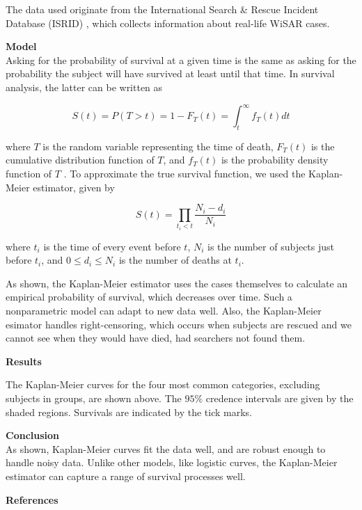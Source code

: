 \documentclass[serif,final]{beamer}
\newcommand{\heading}[1]{{\large \textbf{#1}}\\}
\newcommand{\subheading}[1]{{\textbf{#1}}\\}
\begin{document}
\begin{frame}
\begin{multicols}{3}
      The data used originate from the International Search \& Rescue Incident
      Database (ISRID) \cite{isrid}, which collects information about real-life
      WiSAR cases.

      \indent

      \subheading{Model}

      Asking for the probability of survival at a given time is the same as
      asking for the probability the subject will have survived at least until
      that time. In survival analysis, the latter can be written as

      $$S(t) = P(T > t) = 1 - F_T(t) = \int_t^\infty f_T(t) dt$$

      where $T$ is the random variable representing the time of death, $F_T(t)$
      is the cumulative distribution function of $T$, and $f_T(t)$ is the
      probability density function of $T$ \cite{rochford}. To approximate the
      true survival function, we used the Kaplan-Meier estimator, given by

      $$S(t) = \prod_{t_i < t} \frac{N_i - d_i}{N_i}$$

      where $t_i$ is the time of every event before $t$, $N_i$ is the number of
      subjects just before $t_i$, and $0 \leq d_i \leq N_i$ is the number of
      deaths at $t_i$.

      \indent

      As shown, the Kaplan-Meier estimator uses the cases themselves to
      calculate an empirical probability of survival, which decreases over
      time. Such a nonparametric model can adapt to new data well. Also, the
      Kaplan-Meier esimator handles right-censoring, which occurs when subjects
      are rescued and we cannot see when they would have died, had searchers
      not found them.

      \indent

      \vfill
      \columnbreak

      \heading{Results}

      \begin{center}
        
      \end{center}

      The Kaplan-Meier curves for the four most common categories, excluding
      subjects in groups, are shown above. The $95\%$ credence intervals are
      given by the shaded regions. Survivals are indicated by the tick marks.

      \indent

      \heading{Conclusion}
        As shown, Kaplan-Meier curves fit the data well, and are robust enough
        to handle noisy data. Unlike other models, like logistic curves, the
        Kaplan-Meier estimator can capture a range of survival processes well.

      \indent

      \heading{References}
      
      
    \end{multicols}
  \end{frame}
\end{document}
